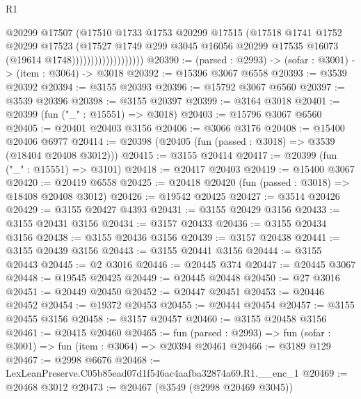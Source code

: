 \begin{lexlean}{R1}
\begin{coremodule}
                                  @20299
                                  @17507
                                  (@17510
                                    @1733
                                    @1753
                                    @20299
                                    @17515
                                    (@17518
                                      @1741
                                      @1752
                                      @20299
                                      @17523
                                      (@17527
                                        @1749
                                        @299
                                        @3045
                                        @16056
                                        @20299
                                        @17535
                                        @16073
                                        (@19614 @1748)))))))))))))))))))
@20390 := (parsed : @2993) -> (sofar : @3001) -> (item : @3064) -> @3018
@20392 := @15396 @3067 @6558
@20393 := @3539 @20392
@20394 := @3155 @20393
@20396 := @15792 @3067 @6560
@20397 := @3539 @20396
@20398 := @3155 @20397
@20399 := @3164 @3018
@20401 := @20399 (fun ("_" : @15551) => @3018)
@20403 := @15796 @3067 @6560
@20405 := @20401 @20403 @3156
@20406 := @3066 @3176
@20408 := @15400 @20406 @6977
@20414 := @20398 (@20405 (fun (passed : @3018) => @3539 (@18404 @20408 @3012)))
@20415 := @3155 @20414
@20417 := @20399 (fun ("_" : @15551) => @3101)
@20418 := @20417 @20403
@20419 := @15400 @3067
@20420 := @20419 @6558
@20425 := @20418 @20420 (fun (passed : @3018) => @18408 @20408 @3012)
@20426 := @19542 @20425
@20427 := @3514 @20426
@20429 := @3155 @20427 @4393
@20431 := @3155 @20429 @3156
@20433 := @3155 @20431 @3156
@20434 := @3157 @20433
@20436 := @3155 @20434 @3156
@20438 := @3155 @20436 @3156
@20439 := @3157 @20438
@20441 := @3155 @20439 @3156
@20443 := @3155 @20441 @3156
@20444 := @3155 @20443
@20445 := @2 @3016
@20446 := @20445 @374
@20447 := @20445 @3067
@20448 := @19545 @20425
@20449 := @20445 @20448
@20450 := @27 @3016
@20451 := @20449 @20450
@20452 := @20447 @20451
@20453 := @20446 @20452
@20454 := @19372 @20453
@20455 := @20444 @20454
@20457 := @3155 @20455 @3156
@20458 := @3157 @20457
@20460 := @3155 @20458 @3156
@20461 := @20415 @20460
@20465 := fun (parsed : @2993) => fun (sofar : @3001) => fun (item : @3064) => @20394 @20461
@20466 := @3189 @129
@20467 := @2998 @6676
@20468 := LexLeanPreserve.C05b85ead07d1f546ac4aafba32874a69.R1.__enc_1
@20469 := @20468 @3012
@20473 := @20467 (@3549 (@2998 @20469 @3045))

\end{coremodule}
\end{lexlean}
